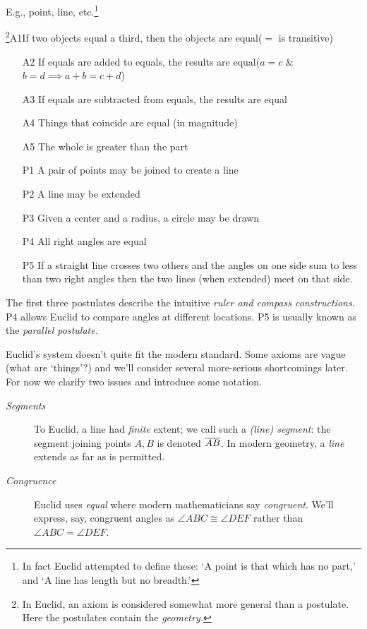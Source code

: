 
\begin{description}\itemsep0pt
	\item[\normalfont\emph{Undefined Terms}] E.g., point, line, etc.\footnote{In fact Euclid attempted to define these: `A point is that which has no part,' and `A line has length but no breadth.'}
	\item[\normalfont\emph{Axioms/Postulates}]\negthickspace\!\footnote{In Euclid, an axiom is considered somewhat more general than a postulate. Here the postulates contain the \emph{geometry.}}\lstsp A1\lstsp If two objects equal a third, then the objects are equal\hfill ($=$ is transitive)\vspace{-5pt}
	\begin{itemize}
		\item[A2] If equals are added to equals, the results are equal\hfill ($a=c$ \& $b=d\implies a+b=c+d$)
		\item[A3] If equals are subtracted from equals, the results are equal
		\item[A4] Things that coincide are equal (in magnitude)
		\item[A5] The whole is greater than the part
		\item[P1] A pair of points may be joined to create a line
		\item[P2] A line may be extended
		\item[P3] Given a center and a radius, a circle may be drawn
		\item[P4] All right angles are equal
		\item[P5] If a straight line crosses two others and the angles on one side sum to less than two right angles then the two lines (when extended) meet on that side.
	\end{itemize}
\end{description}

\goodbreak

The first three postulates describe the intuitive \emph{ruler and compass constructions.} P4 allows Euclid to compare angles at different locations. P5 is usually known as the \emph{parallel postulate.}
\bigbreak

Euclid's system doesn't quite fit the modern standard. Some axioms are vague (what are `things'?) and we'll consider several more-serious shortcomings later. For now we clarify two issues and introduce some notation.
\begin{description}
	\item[\normalfont\emph{Segments}] To Euclid, a line had \emph{finite} extent; we call such a \emph{(line) segment}: the segment joining points $A,B$ is denoted $\overline{AB}$. In modern geometry, a \emph{line} extends as far as is permitted.
	\item[\normalfont\emph{Congruence}] Euclid uses \emph{equal} where modern mathematicians say \emph{congruent}. We'll express, say, congruent angles as $\angle ABC\cong\angle DEF$ rather than $\angle ABC=\angle DEF$.
\end{description}


